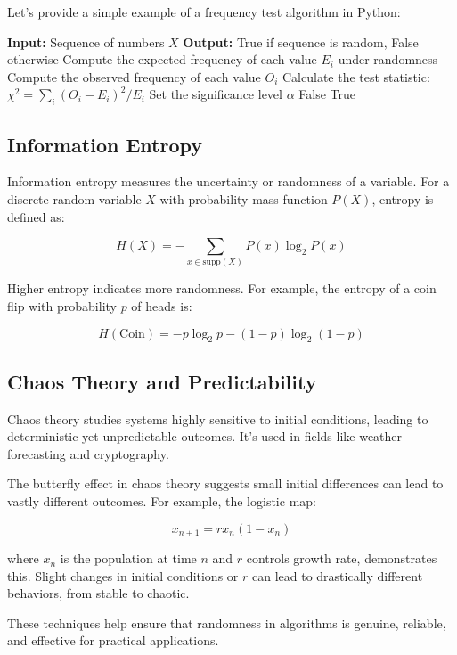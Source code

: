 \documentclass[12pt]{book} %
\begin{document}
Let's provide a simple example of a frequency test algorithm in Python:
\FloatBarrier
\begin{algorithm}
\caption{Frequency Test Algorithm}\label{freq_test}
\begin{algorithmic}[1]
\State \textbf{Input:} Sequence of numbers $X$
\State \textbf{Output:} True if sequence is random, False otherwise
\State Compute the expected frequency of each value $E_i$ under randomness
\State Compute the observed frequency of each value $O_i$
\State Calculate the test statistic: $\chi^2 = \sum_{i}(O_i - E_i)^2 / E_i$
\State Set the significance level $\alpha$
    \Return False
\Else
    \Return True
\EndIf
\end{algorithmic}
\end{algorithm}
\FloatBarrier

\subsection{Information Entropy}
Information entropy measures the uncertainty or randomness of a variable. For a discrete random variable $X$ with probability mass function $P(X)$, entropy is defined as:

\[
H(X) = -\sum_{x \in \text{supp}(X)} P(x) \log_2 P(x)
\]

Higher entropy indicates more randomness. For example, the entropy of a coin flip with probability $p$ of heads is:

\[
H(\text{Coin}) = -p \log_2 p - (1-p) \log_2 (1-p)
\]

\subsection{Chaos Theory and Predictability}
Chaos theory studies systems highly sensitive to initial conditions, leading to deterministic yet unpredictable outcomes. It's used in fields like weather forecasting and cryptography.

The butterfly effect in chaos theory suggests small initial differences can lead to vastly different outcomes. For example, the logistic map:

\[
x_{n+1} = r x_n (1 - x_n)
\]

where $x_n$ is the population at time $n$ and $r$ controls growth rate, demonstrates this. Slight changes in initial conditions or $r$ can lead to drastically different behaviors, from stable to chaotic.

These techniques help ensure that randomness in algorithms is genuine, reliable, and effective for practical applications.
\end{document}
